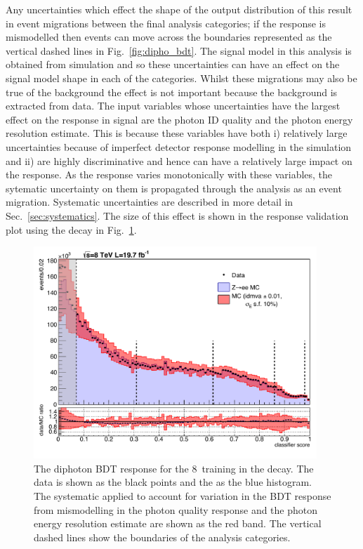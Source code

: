 Any uncertainties which effect the shape of the output distribution of this \BDT result in event migrations between the final analysis categories; if the \BDT response is mismodelled then events can move across the boundaries represented as the vertical dashed lines in Fig.~\ref{fig:dipho_bdt}. The signal model in this analysis is obtained from \MC simulation and so these uncertainties can have an effect on the signal model shape in each of the categories. Whilst these migrations may also be true of the background the effect is not important because the background is extracted from data. The input variables whose uncertainties have the largest effect on the \BDT response in signal are the photon ID quality and the photon energy resolution estimate. This is because these variables have both i) relatively large uncertainties because of imperfect detector response modelling in the simulation and ii) are highly discriminative and hence can have a relatively large impact on the \BDT response. As the \BDT response varies monotonically with these variables, the sytematic uncertainty on them is propagated through the analysis as an event migration. Systematic uncertainties are described in more detail in Sec.~\ref{sec:systematics}. The size of this effect is shown in the \BDT response validation plot using the \Zee decay in Fig.~\ref{fig:diphotonBDT_zee}.

\begin{figure}
  \includegraphics[width=0.95\textwidth]{selec_and_cats/plots/transformedBDT_single_syst_fix.pdf}
  \caption[The diphoton \BDT response in \Zee decays]{The diphoton BDT response for the 8~\TeV training in the \Zee decay. The data is shown as the black points and the \MC as the blue histogram. The systematic applied to account for variation in the BDT response from mismodelling in the photon quality response and the photon energy resolution estimate are shown as the red band. The vertical dashed lines show the boundaries of the analysis categories.}
  \label{fig:diphotonBDT_zee}
\end{figure}

